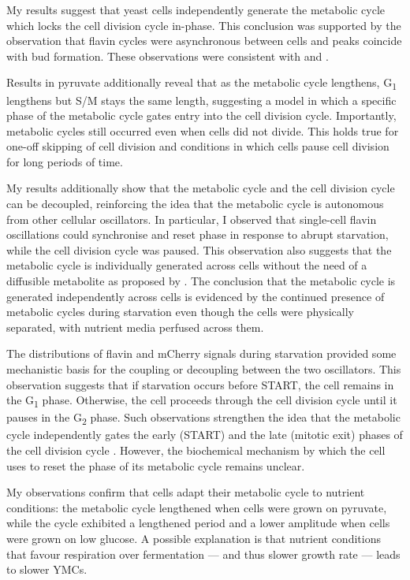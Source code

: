 My results suggest that yeast cells independently generate the metabolic cycle which locks the cell division cycle in-phase.
This conclusion was supported by the observation that flavin cycles were asynchronous between cells and peaks coincide with bud formation.
These observations were consistent with \textcite{papagiannakisAutonomousMetabolicOscillations2017} and \textcite{baumgartnerFlavinbasedMetabolicCycles2018}.

Results in pyruvate additionally reveal that as the metabolic cycle lengthens, G\textsubscript{1} lengthens but S/M stays the same length, suggesting a model in which a specific phase of the metabolic cycle gates entry into the cell division cycle.
Importantly, metabolic cycles still occurred even when cells did not divide.
This holds true for one-off skipping of cell division and conditions in which cells pause cell division for long periods of time.

My results additionally show that the metabolic cycle and the cell division cycle can be decoupled, reinforcing the idea that the metabolic cycle is autonomous from other cellular oscillators.
In particular, I observed that single-cell flavin oscillations could synchronise and reset phase in response to abrupt starvation, while the cell division cycle was paused.
This observation also suggests that the metabolic cycle is individually generated across cells without the need of a diffusible metabolite as proposed by \textcite{krishnaMinimalPushPull2018}.
The conclusion that the metabolic cycle is generated independently across cells is evidenced by the continued presence of metabolic cycles during starvation even though the cells were physically separated, with nutrient media perfused across them.

The distributions of flavin and mCherry signals during starvation provided some mechanistic basis for the coupling or decoupling between the two oscillators.
This observation suggests that if starvation occurs before START, the cell remains in the G\textsubscript{1} phase.
Otherwise, the cell proceeds through the cell division cycle until it pauses in the G\textsubscript{2} phase.
Such observations strengthen the idea that the metabolic cycle independently gates the early (START) and the late (mitotic exit) phases of the cell division cycle \parencite{ozsezenInferenceHighLevelInteraction2019}.
However, the biochemical mechanism by which the cell uses to reset the phase of its metabolic cycle remains unclear.

My observations confirm that cells adapt their metabolic cycle to nutrient conditions:
the metabolic cycle lengthened when cells were grown on pyruvate, while the cycle exhibited a lengthened period and a lower amplitude when cells were grown on low glucose.
A possible explanation is that nutrient conditions that favour respiration over fermentation --- and thus slower growth rate --- leads to slower YMCs.

